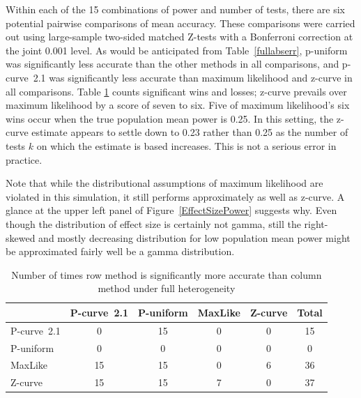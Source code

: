 \documentclass[jou]{apa6} %
\begin{document}
Within each of the 15 combinations of power and number of tests, there are six potential pairwise comparisons of mean accuracy. These comparisons were carried out using large-sample two-sided matched Z-tests with a Bonferroni correction at the joint 0.001 level. As would be anticipated from Table~\ref{fullabserr}, p-uniform was significantly less accurate than the other methods in all comparisons, and p-curve~2.1 was significantly less accurate than maximum likelihood and z-curve in all comparisons.
Table \ref{fullcontest} counts significant wins and losses; z-curve prevails over maximum likelihood by a score of seven to six. Five of maximum likelihood's six wins occur when the true population mean power is 0.25. In this setting, the z-curve estimate appears to settle down to 0.23 rather than 0.25 as the number of tests $k$ on which the estimate is based increases. This is not a serious error in practice. 

Note that while the distributional assumptions of maximum likelihood are violated in this simulation, it still performs approximately as well as z-curve. A glance at the upper left panel of Figure~\ref{EffectSizePower} suggests why. Even though the distribution of effect size is certainly not gamma, still the right-skewed and mostly decreasing distribution for low population mean power might be approximated fairly well be a gamma distribution.

\begin{table}[h]
\caption{Number of times row method is significantly more accurate than column method under full heterogeneity}
{\small
\begin{center}
\begin{tabular}{l ccccc }  \hline
          & P-curve~2.1  &  P-uniform & MaxLike & Z-curve &   Total  \\ \hline
P-curve~2.1   &    0     &      15    &    0    &   0     &     15   \\
P-uniform &    0     &       0    &    0    &   0     &      0   \\
MaxLike   &   15     &      15    &    0    &   6     &     36   \\
Z-curve   &   15     &      15    &    7    &   0     &     37   \\ \hline
\end{tabular}
\end{center}
} %
\label{fullcontest}  %
\end{table}
\end{document}
